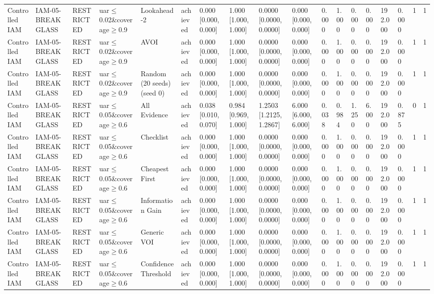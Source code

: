 \begin{table}[!ht]
{\begin{tabular}{llllllllllllllllll}
Controlled IAM & IAM-05-BREAKGLASS & RESTRICTED & uar$\le$0.02\&coverage$\ge$0.9 & Lookahead-2 & achieved & 0.000 [0.000, 0.000] & 1.000 [1.000, 1.000] & 0.0000 [0.0000, 0.0000] & 0.000 [0.000, 0.000] & 0.000 & 1.000 & 0.000 & 0.000 & 192.000 & 0.000 & 1 & 1 \\
Controlled IAM & IAM-05-BREAKGLASS & RESTRICTED & uar$\le$0.02\&coverage$\ge$0.9 & AVOI & achieved & 0.000 [0.000, 0.000] & 1.000 [1.000, 1.000] & 0.0000 [0.0000, 0.0000] & 0.000 [0.000, 0.000] & 0.000 & 1.000 & 0.000 & 0.000 & 192.000 & 0.000 & 1 & 1 \\
Controlled IAM & IAM-05-BREAKGLASS & RESTRICTED & uar$\le$0.02\&coverage$\ge$0.9 & Random (20 seeds) (seed 0) & achieved & 0.000 [0.000, 0.000] & 1.000 [1.000, 1.000] & 0.0000 [0.0000, 0.0000] & 0.000 [0.000, 0.000] & 0.000 & 1.000 & 0.000 & 0.000 & 192.000 & 0.000 & 1 & 1 \\
Controlled IAM & IAM-05-BREAKGLASS & RESTRICTED & uar$\le$0.05\&coverage$\ge$0.6 & All Evidence & achieved & 0.038 [0.010, 0.070] & 0.984 [0.969, 1.000] & 1.2503 [1.2125, 1.2867] & 6.000 [6.000, 6.000] & 0.038 & 0.984 & 1.250 & 6.000 & 192.000 & 0.875 & 0 & 1 \\
Controlled IAM & IAM-05-BREAKGLASS & RESTRICTED & uar$\le$0.05\&coverage$\ge$0.6 & Checklist & achieved & 0.000 [0.000, 0.000] & 1.000 [1.000, 1.000] & 0.0000 [0.0000, 0.0000] & 0.000 [0.000, 0.000] & 0.000 & 1.000 & 0.000 & 0.000 & 192.000 & 0.000 & 1 & 1 \\
Controlled IAM & IAM-05-BREAKGLASS & RESTRICTED & uar$\le$0.05\&coverage$\ge$0.6 & Cheapest First & achieved & 0.000 [0.000, 0.000] & 1.000 [1.000, 1.000] & 0.0000 [0.0000, 0.0000] & 0.000 [0.000, 0.000] & 0.000 & 1.000 & 0.000 & 0.000 & 192.000 & 0.000 & 1 & 1 \\
Controlled IAM & IAM-05-BREAKGLASS & RESTRICTED & uar$\le$0.05\&coverage$\ge$0.6 & Information Gain & achieved & 0.000 [0.000, 0.000] & 1.000 [1.000, 1.000] & 0.0000 [0.0000, 0.0000] & 0.000 [0.000, 0.000] & 0.000 & 1.000 & 0.000 & 0.000 & 192.000 & 0.000 & 1 & 1 \\
Controlled IAM & IAM-05-BREAKGLASS & RESTRICTED & uar$\le$0.05\&coverage$\ge$0.6 & Generic VOI & achieved & 0.000 [0.000, 0.000] & 1.000 [1.000, 1.000] & 0.0000 [0.0000, 0.0000] & 0.000 [0.000, 0.000] & 0.000 & 1.000 & 0.000 & 0.000 & 192.000 & 0.000 & 1 & 1 \\
Controlled IAM & IAM-05-BREAKGLASS & RESTRICTED & uar$\le$0.05\&coverage$\ge$0.6 & Confidence Threshold & achieved & 0.000 [0.000, 0.000] & 1.000 [1.000, 1.000] & 0.0000 [0.0000, 0.0000] & 0.000 [0.000, 0.000] & 0.000 & 1.000 & 0.000 & 0.000 & 192.000 & 0.000 & 1 & 1 \\

\end{tabular}}
\end{table}
